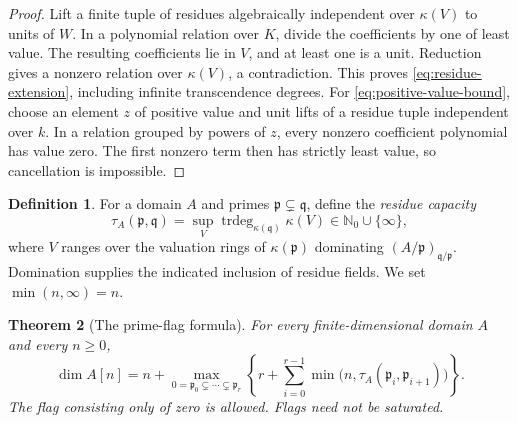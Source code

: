\documentclass[11pt,reqno]{amsart}
\numberwithin{equation}{section}
\theoremstyle{plain}
\newtheorem{theorem}{Theorem}[section]
\theoremstyle{definition}
\newtheorem{definition}[theorem]{Definition}
\theoremstyle{remark}
\begin{document}
\begin{proof}
Lift a finite tuple of residues algebraically independent over
\(\kappa(V)\) to units of \(W\). In a polynomial relation over
\(K\), divide the coefficients by one of least value. The resulting
coefficients lie in \(V\), and at least one is a unit. Reduction gives
a nonzero relation over \(\kappa(V)\), a contradiction. This proves
\eqref{eq:residue-extension}, including infinite transcendence degrees.
For \eqref{eq:positive-value-bound}, choose an element \(z\) of
positive value and unit lifts of a residue tuple independent over \(k\).
In a relation grouped by powers of \(z\), every nonzero coefficient
polynomial has value zero. The first nonzero term then has strictly
least value, so cancellation is impossible.
\end{proof}

\begin{definition}\label{def:capacity}
For a domain \(A\) and primes \(\mathfrak p\subsetneq\mathfrak q\),
define the \emph{residue capacity}
\[
 \tau_A(\mathfrak p,\mathfrak q)
 =\sup_V\operatorname{trdeg}_{\kappa(\mathfrak q)}\kappa(V)
 \in\mathbb N_0\cup\{\infty\},
\]
where \(V\) ranges over the valuation rings of
\(\kappa(\mathfrak p)\) dominating
\((A/\mathfrak p)_{\mathfrak q/\mathfrak p}\). Domination supplies
the indicated inclusion of residue fields. We set
\(\min(n,\infty)=n\).
\end{definition}

\begin{theorem}[The prime-flag formula]\label{thm:capacity}
For every finite-dimensional domain \(A\) and every \(n\geq0\),
\begin{equation}\label{eq:capacity-formula}
 \dim A[n]=n+\max_{0=\mathfrak p_0\subsetneq\cdots\subsetneq\mathfrak p_r}
 \left\{r+\sum_{i=0}^{r-1}
        \min\bigl(n,\tau_A(\mathfrak p_i,\mathfrak p_{i+1})\bigr)\right\}.
\end{equation}
The flag consisting only of zero is allowed. Flags need not be saturated.
\end{theorem}
\end{document}
